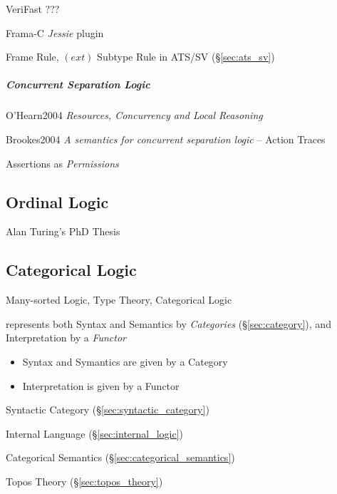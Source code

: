 VeriFast ???

Frama-C \emph{Jessie} plugin

Frame Rule, \fist $(ext)$ Subtype Rule in ATS/SV (\S\ref{sec:ats_sv})



\subparagraph{Concurrent Separation Logic}
\label{sec:concurrent_separation}\hfill

O'Hearn2004 \emph{Resources, Concurrency and Local Reasoning}

Brookes2004 \emph{A semantics for concurrent separation logic} --
Action Traces

Assertions as \emph{Permissions}



\subsection{Ordinal Logic}\label{sec:ordinal_logic}

Alan Turing's PhD Thesis \cite{turing38}



\subsection{Categorical Logic}\label{sec:categorical_logic}

Many-sorted Logic, Type Theory, Categorical Logic

represents both Syntax and Semantics by \emph{Categories}
(\S\ref{sec:category}), and Interpretation by a \emph{Functor}

\begin{itemize}
  \item Syntax and Symantics are given by a Category
  \item Interpretation is given by a Functor
\end{itemize}

Syntactic Category (\S\ref{sec:syntactic_category})

Internal Language (\S\ref{sec:internal_logic})

Categorical Semantics (\S\ref{sec:categorical_semantics})

Topos Theory (\S\ref{sec:topos_theory})

